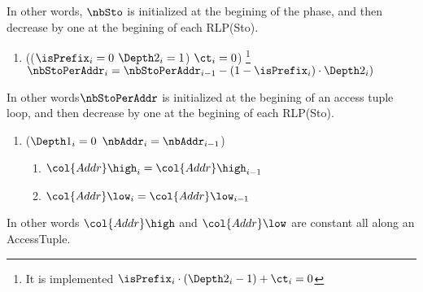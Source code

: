 In other words, $\nbSto$ is initialized at the begining of the phase, and then decrease by one at the begining of each RLP(Sto).
\begin{enumerate}[resume]
	\item \If (($\isPrefix_{i}=0$ \Or $\Depth2_{i}=1$) \et $\ct_{i}=0$) \footnote{It is implemented \If $\isPrefix_{i} \cdot (\Depth2_{i}-1) +\ct_{i} =0$ \Then} \Then $\nbStoPerAddr_{i} = \nbStoPerAddr_{i-1} - (1- \isPrefix_{i}) \cdot \Depth2_{i})$
\end{enumerate}
In other words$\nbStoPerAddr$ is initialized at the begining of an access tuple loop, and then decrease by one at the begining of each RLP(Sto).
\begin{enumerate}[resume]
	\item \If ($\Depth1_{i}=0$ \et $\nbAddr_{i}=\nbAddr_{i-1}$) \Then 
	\begin{enumerate}
		\item $\col{Addr}\high_{i} = \col{Addr}\high_{i-1}$
		\item $\col{Addr}\low_{i} = \col{Addr}\low_{i-1}$
	\end{enumerate}
\end{enumerate}
In other words $\col{Addr}\high$ and $\col{Addr}\low$ are constant all along an AccessTuple.
